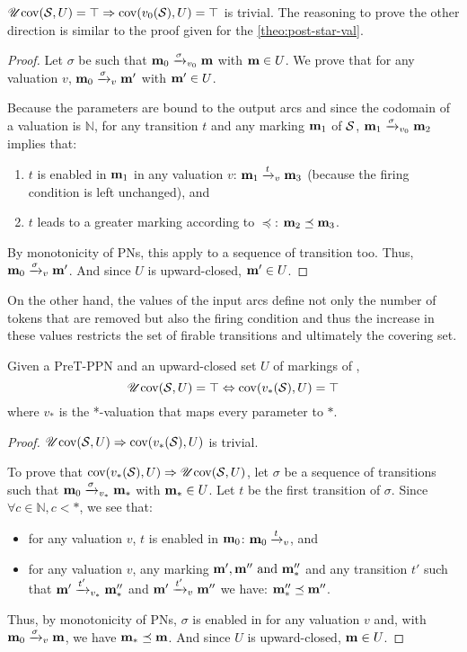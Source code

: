 \(\UcovOp(\PPN, U) = \top \Rightarrow \covOp(v_0(\PPN), U) = \top\) is trivial.
The reasoning to prove the other direction is similar to the proof given for the \autoref{theo:post-star-val}.

\begin{proof}
  Let $\sigma$ be such that $\mari \fire[\val_0]{\sigma} \mar$ with $\mar \in U$.
  We prove that for any valuation $v$, $\mari \fire[v]{\sigma} \marp$ with $\marp \in U$.

  Because the parameters are bound to the output arcs and since the codomain of a valuation is $\mathbb{N}$, for any transition $t$ and any marking $\mar_1$ of $\PPN$, $\mar_1 \fire[v_0]{\sigma} \mar_2$ implies that:
  \begin{enumerate}
    \item $t$ is enabled in $\mar_1$ in any valuation $v$: $\mar_1 \fire[v]{t} \mar_3$ (because the firing condition is left unchanged), and
    \item $t$ leads to a greater marking according to $\preceq$: $\mar_2 \preceq \mar_3$.
  \end{enumerate}

  By monotonicity of \acp{PN}, this apply to a sequence of transition too.
  Thus, $\mari \fire[v]{\sigma} \marp$.
  And since $U$ is upward-closed, $\marp \in U$.
\end{proof}

On the other hand, the values of the input arcs define not only the number of tokens that are removed but also the firing condition and thus the increase in these values restricts the set of firable transitions and ultimately the covering set.

\begin{theo}
  \label{theo:pre-u-star-val}
  Given a PreT-\ac{PPN} \SPTPm and an upward-closed set $U$ of markings of \PPN, \[\UcovOp(\PPN, U) = \top \Leftrightarrow \covOp(v_*(\PPN), U) = \top\] where $v_*$ is the *-valuation that maps every parameter to $*$.
\end{theo}

\begin{proof}
  $\UcovOp(\PPN, U) \Rightarrow \covOp(v_*(\PPN), U)$ is trivial.

  To prove that $\covOp(v_*(\PPN), U) \Rightarrow \UcovOp(\PPN, U)$, let $\sigma$ be a sequence of transitions such that $\mari \fire[v_*]{\sigma} \mar_*$ with $\mar_* \in U$.
  Let $t$ be the first transition of $\sigma$.
  Since $\forall c \in \mathbb{N}, c < *$, we see that:
  \begin{itemize}
    \item for any valuation $v$, $t$ is enabled in $\mari$: $\mari \fire[v]{t}$, and
    \item for any valuation $v$, any marking $\mar', \mar'' \text{ and } \mar''_*$ and any transition $t'$ such that $\mar' \fire[v_*]{t'} \mar''_*$ and $\mar' \fire[v]{t'} \mar''$ we have: $\mar''_* \preceq \mar''$.
  \end{itemize}

  Thus, by monotonicity of \acp{PN}, $\sigma$ is enabled in \mari for any valuation $v$ and, with $\mari \fire[v]{\sigma} \mar$, we have $\mar_* \preceq \mar$.
  And since $U$ is upward-closed, $\mar \in U$.
\end{proof}

